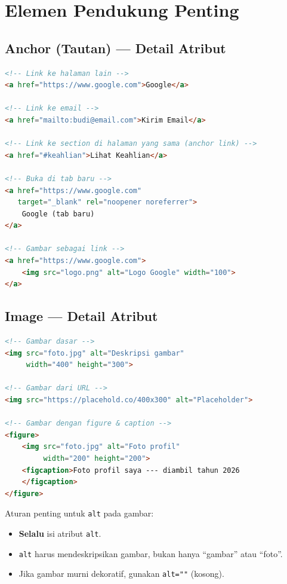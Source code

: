 \section{Elemen Pendukung Penting}
\label{sec:m03-pendukung}

\subsection{Anchor (Tautan) --- Detail Atribut}

\begin{lstlisting}[language=HTML, caption={Berbagai jenis tautan}, label={lst:m03-link}]
<!-- Link ke halaman lain -->
<a href="https://www.google.com">Google</a>

<!-- Link ke email -->
<a href="mailto:budi@email.com">Kirim Email</a>

<!-- Link ke section di halaman yang sama (anchor link) -->
<a href="#keahlian">Lihat Keahlian</a>

<!-- Buka di tab baru -->
<a href="https://www.google.com"
   target="_blank" rel="noopener noreferrer">
    Google (tab baru)
</a>

<!-- Gambar sebagai link -->
<a href="https://www.google.com">
    <img src="logo.png" alt="Logo Google" width="100">
</a>
\end{lstlisting}

\subsection{Image --- Detail Atribut}

\begin{lstlisting}[language=HTML, caption={Berbagai cara menampilkan gambar}, label={lst:m03-img}]
<!-- Gambar dasar -->
<img src="foto.jpg" alt="Deskripsi gambar"
     width="400" height="300">

<!-- Gambar dari URL -->
<img src="https://placehold.co/400x300" alt="Placeholder">

<!-- Gambar dengan figure & caption -->
<figure>
    <img src="foto.jpg" alt="Foto profil"
         width="200" height="200">
    <figcaption>Foto profil saya --- diambil tahun 2026
    </figcaption>
</figure>
\end{lstlisting}

\begin{peringatan}
Aturan penting untuk \texttt{alt} pada gambar:
\begin{itemize}
  \item \textbf{Selalu} isi atribut \texttt{alt}.
  \item \texttt{alt} harus mendeskripsikan gambar, bukan hanya ``gambar'' atau ``foto''.
  \item Jika gambar murni dekoratif, gunakan \texttt{alt=""} (kosong).
\end{itemize}
\end{peringatan}

